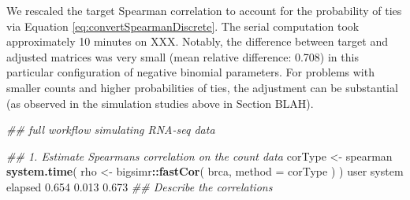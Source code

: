 \documentclass[
]{article}
\newenvironment{Shaded}{\begin{snugshade}}{\end{snugshade}}
\newcommand{\CommentTok}[1]{\textcolor[rgb]{0.56,0.35,0.01}{\textit{#1}}}
\newcommand{\DataTypeTok}[1]{\textcolor[rgb]{0.13,0.29,0.53}{#1}}
\newcommand{\FloatTok}[1]{\textcolor[rgb]{0.00,0.00,0.81}{#1}}
\newcommand{\KeywordTok}[1]{\textcolor[rgb]{0.13,0.29,0.53}{\textbf{#1}}}
\newcommand{\NormalTok}[1]{#1}
\newcommand{\OperatorTok}[1]{\textcolor[rgb]{0.81,0.36,0.00}{\textbf{#1}}}
\newcommand{\StringTok}[1]{\textcolor[rgb]{0.31,0.60,0.02}{#1}}
\begin{document}
We rescaled the target Spearman correlation to account for the probability of ties via Equation \eqref{eq:convertSpearmanDiscrete}. The serial computation took approximately 10 minutes on XXX. Notably, the difference between target and adjusted matrices was very small (mean relative difference: 0.708) in this particular configuration of negative binomial parameters. For problems with smaller counts and higher probabilities of ties, the adjustment can be substantial (as observed in the simulation studies above in Section BLAH).

\begin{Shaded}
\begin{Highlighting}[]
\CommentTok{\#\# full workflow simulating RNA{-}seq data}

\CommentTok{\#\# 1. Estimate Spearman\textquotesingle{}s correlation on the count data}
\NormalTok{corType \textless{}{-}}\StringTok{ \textquotesingle{}spearman\textquotesingle{}}
\KeywordTok{system.time}\NormalTok{( rho \textless{}{-}}\StringTok{ }\NormalTok{bigsimr}\OperatorTok{::}\KeywordTok{fastCor}\NormalTok{( brca, }\DataTypeTok{method =}\NormalTok{ corType ) )}
\NormalTok{   user  system elapsed }
  \FloatTok{0.654}   \FloatTok{0.013}   \FloatTok{0.673} 
\CommentTok{\#\# Describe the correlations}
\end{Highlighting}
\end{Shaded}
\end{document}
